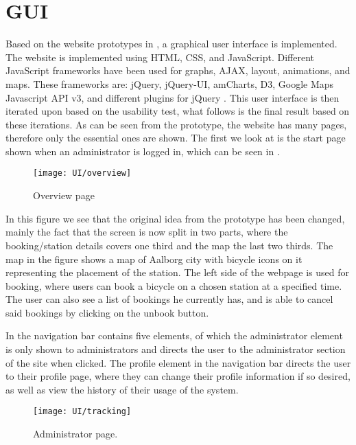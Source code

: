 \section{GUI}

Based on the website prototypes in , a graphical user interface is implemented.
The website is implemented using HTML, CSS, and JavaScript. 
Different JavaScript frameworks have been used for graphs, AJAX, layout, animations, and maps. 
These frameworks are: jQuery, jQuery-UI, amCharts, D3, Google Maps Javascript API v3, and different plugins for jQuery \citep{misc:googlehostedlibs, misc:d3js, misc:googlemapsapi, misc:amcharts}.
This user interface is then iterated upon based on the usability test, what follows is the final result based on these iterations. 
As can be seen from the prototype, the website has many pages, therefore only the essential ones are shown.
The first we look at is the start page shown when an administrator is logged in, which can be seen in .

\begin{figure}[h]
	\centering
	\texttt{[image: UI/overview]}
	\caption{Overview page}\label{fig:UI-overview}
\end{figure}

In this figure we see that the original idea from the prototype has been changed, mainly the fact that the screen is now split in two parts, where the booking/station details covers one third and the map the last two thirds.
The map in the figure shows a map of Aalborg city with bicycle icons on it representing the placement of the station.
The left side of the webpage is used for booking, where users can book a bicycle on a chosen station at a specified time.
The user can also see a list of bookings he currently has, and is able to cancel said bookings by clicking on the unbook button.

In  the navigation bar contains five elements, of which the administrator element is only shown to administrators and directs the user to the administrator section of the site when clicked.
The profile element in the navigation bar directs the user to their profile page, where they can change their profile information if so desired, as well as view the history of their usage of the system.

\begin{figure}[h]
	\centering
	\texttt{[image: UI/tracking]}
	\caption{Administrator page.}\label{fig:UI-admin}
\end{figure}

